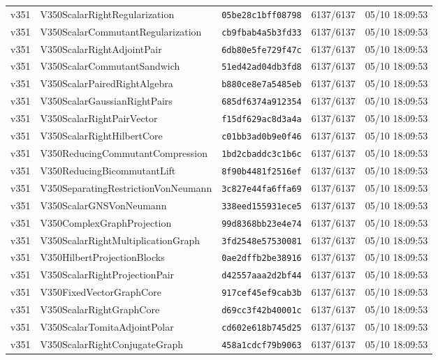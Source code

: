 \documentclass[11pt]{article}
\theoremstyle{definition}\newtheorem{deriv}{Derivação}
\begin{document}
{\begin{longtable}{@{}lllll@{}}
v351 & V350ScalarRightRegularization & \texttt{05be28c1bff08798} & 6137/6137 & 05/10 18:09:53 \\
v351 & V350ScalarCommutantRegularization & \texttt{cb9fbab4a5b3fd33} & 6137/6137 & 05/10 18:09:53 \\
v351 & V350ScalarRightAdjointPair & \texttt{6db80e5fe729f47c} & 6137/6137 & 05/10 18:09:53 \\
v351 & V350ScalarCommutantSandwich & \texttt{51ed42ad04db3fd8} & 6137/6137 & 05/10 18:09:53 \\
v351 & V350ScalarPairedRightAlgebra & \texttt{b880ce8e7a5485eb} & 6137/6137 & 05/10 18:09:53 \\
v351 & V350ScalarGaussianRightPairs & \texttt{685df6374a912354} & 6137/6137 & 05/10 18:09:53 \\
v351 & V350ScalarRightPairVector & \texttt{f15df629ac8d3a4a} & 6137/6137 & 05/10 18:09:53 \\
v351 & V350ScalarRightHilbertCore & \texttt{c01bb3ad0b9e0f46} & 6137/6137 & 05/10 18:09:53 \\
v351 & V350ReducingCommutantCompression & \texttt{1bd2cbaddc3c1b6c} & 6137/6137 & 05/10 18:09:53 \\
v351 & V350ReducingBicommutantLift & \texttt{8f90b4481f2516ef} & 6137/6137 & 05/10 18:09:53 \\
v351 & V350SeparatingRestrictionVonNeumann & \texttt{3c827e44fa6ffa69} & 6137/6137 & 05/10 18:09:53 \\
v351 & V350ScalarGNSVonNeumann & \texttt{338eed155931ece5} & 6137/6137 & 05/10 18:09:53 \\
v351 & V350ComplexGraphProjection & \texttt{99d8368bb23e4e74} & 6137/6137 & 05/10 18:09:53 \\
v351 & V350ScalarRightMultiplicationGraph & \texttt{3fd2548e57530081} & 6137/6137 & 05/10 18:09:53 \\
v351 & V350HilbertProjectionBlocks & \texttt{0ae2dffb2be38916} & 6137/6137 & 05/10 18:09:53 \\
v351 & V350ScalarRightProjectionPair & \texttt{d42557aaa2d2bf44} & 6137/6137 & 05/10 18:09:53 \\
v351 & V350FixedVectorGraphCore & \texttt{917cef45ef9cab3b} & 6137/6137 & 05/10 18:09:53 \\
v351 & V350ScalarRightGraphCore & \texttt{d69cc3f42b40001c} & 6137/6137 & 05/10 18:09:53 \\
v351 & V350ScalarTomitaAdjointPolar & \texttt{cd602e618b745d25} & 6137/6137 & 05/10 18:09:53 \\
v351 & V350ScalarRightConjugateGraph & \texttt{458a1cdcf79b9063} & 6137/6137 & 05/10 18:09:53 \\

\end{longtable}}
\end{document}
